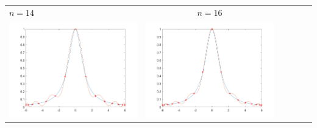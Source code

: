 \small\begin{tabular}{l*{5}{c}}
\hspace{3.5cm}\(n=14\) &  \(n=16\) \\
\includegraphics[scale=0.5]{cap4/4_7/14.png} &  \includegraphics[scale=0.5]{cap4/4_7/16.png} \\


\end{tabular}
